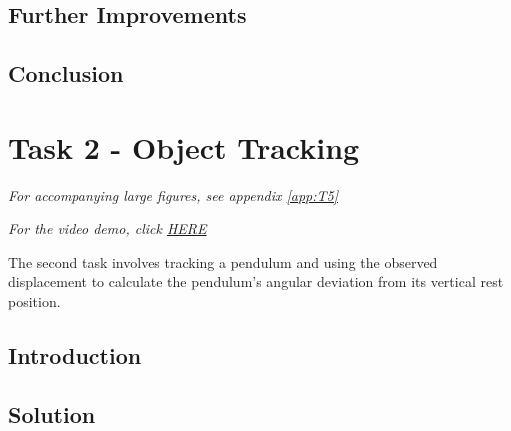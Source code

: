 \documentclass[conference]{IEEEtran}
\begin{document}
%
%

\subsection{Further Improvements} \label{sec:further1}
 
\subsection{Conclusion}

\section{Task 2 - Object Tracking}
\textit{For accompanying large figures, see appendix \ref{app:T5}}

\textit{For the video demo, click \href{https://youtu.be/kW5fbNTTovo}{HERE}}

The second task involves tracking a pendulum and using the observed displacement to calculate the pendulum's angular deviation from its vertical rest position.
\subsection{Introduction}

\subsection{Solution}\label{2_solution}
\end{document}
